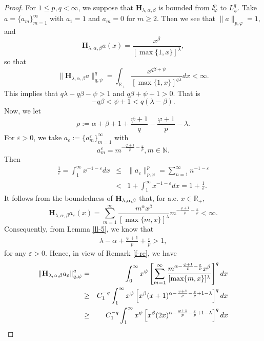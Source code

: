 \documentclass[10pt]{amsart}
\theoremstyle{definition}    %
\numberwithin{equation}{section}
\begin{document}
\begin{proof}
For  $1\leq p, q<\infty$, we suppose that $\mathbf{H}_{\lambda, \alpha, \beta}$ is bounded from $l_{\varphi}^{p}$ to $L_{\psi}^{q}$.  Take $a=\{a_m\}_{m=1}^{\infty}$ with $a_1=1$ and $a_m=0$ for $m\geq 2.$ Then we see that $\|a\|_{p,\varphi}=1,$ and 
 $$\mathbf{H}_{\lambda, \alpha, \beta}a(x)=\frac{x^{\beta}}{[\max\{1,x\}]^{\lambda}},$$
so that $$\|\mathbf{H}_{\lambda, \alpha, \beta}a\|_{q, \psi}^q=\int_{\mathbb{R}_{+}}\frac{x^{q\beta+\psi}}{[\max\{1,x\}]^{q\lambda}}dx<\infty.$$
This implies that $q\lambda-q\beta-\psi>1$ and $q\beta+\psi+1>0$. That is 
$$-q\beta<\psi+1<q(\lambda-\beta).$$
Now, we let 
$$\rho:=\alpha+\beta+1+\frac{\psi+1}{q}-\frac{\varphi+1}{p}-\lambda.$$  
For $\varepsilon>0$, we take $a_{\varepsilon}:=\{a_m^{\varepsilon}\}_{m=1}^{\infty}$ with
\begin{equation}\label{ff-2}a_m^{\varepsilon}=m^{-\frac{\varphi+1}{p}-\frac{\varepsilon}{p}}, m\in \mathbb{N}. 
\end{equation}
Then \begin{eqnarray}\frac{1}{\varepsilon}=\int_{1}^{\infty}x^{-1-\varepsilon}dx&\leq&\|a_{\varepsilon}\|_{p, \varphi}^p=\sum_{n=1}^{\infty}n^{-1-\varepsilon}\nonumber \\
&<&1+\int_{1}^{\infty}x^{-1-\varepsilon}dx=1+\frac{1}{\varepsilon}.\nonumber\end{eqnarray}
It follows from the boundedness of ${\bf H}_{\lambda, \alpha, \beta}$ that, for a.e. $x\in \mathbb{R}_{+}$,  
$$\mathbf{H}_{\lambda, \alpha, \beta}a_{\varepsilon}(x)=\sum_{m=1}^{\infty}\frac{m^{\alpha}x^{\beta}}{[\max\{m,x\}]^{\lambda}}m^{-\frac{\varphi+1}{p}-\frac{\varepsilon}{p}}<\infty.$$
Consequently, from Lemma \ref{ll-5}, we know that 
\begin{eqnarray}\lambda-\alpha+\frac{\varphi+1}{p}+\frac{\varepsilon}{p}>1,\nonumber \end{eqnarray}
for any $\varepsilon>0$. Hence, in view of Remark \ref{f-re}, we have  
\begin{eqnarray}\label{h-2}\|{\bf H}_{\lambda, \alpha, \beta}a_{\varepsilon}\|_{q,\psi}^q&=&\int_{0}^{\infty}x^{\psi}\left [\sum_{m=1}^{\infty}\frac{m^{\alpha-\frac{\varphi+1}{p}-\frac{\varepsilon}{p}}x^{\beta}}{[\max\{m,x\}]^{\lambda}}\right ]^q dx \nonumber \\ 
&\geq & C_1^{-q}\int_{1}^{\infty}x^{\psi}\left[x^{\beta}(x+1)^{\alpha-\frac{\varphi+1}{p}-\frac{\varepsilon}{p}+1-\lambda}\right]^qdx \nonumber \\ 
&\geq & C_1^{-q}\int_{1}^{\infty}x^{\psi}\left[x^{\beta}(2x)^{\alpha-\frac{\varphi+1}{p}-\frac{\varepsilon}{p}+1-\lambda}\right]^qdx \nonumber \\

\end{eqnarray}
\end{proof}
\end{document}
